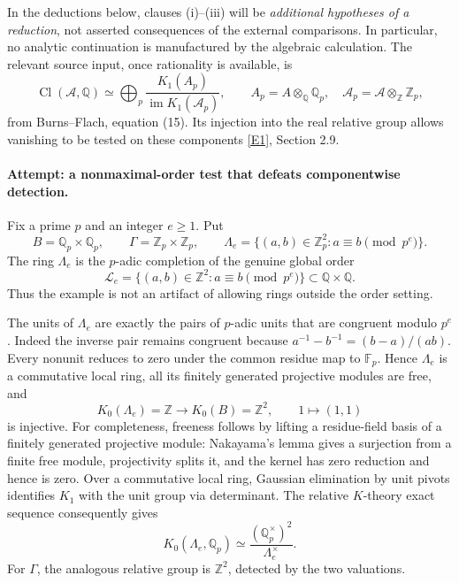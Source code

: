 \documentclass[11pt,a4paper]{article}
\newcommand{\Z}{\mathbb{Z}}
\newcommand{\Q}{\mathbb{Q}}
\newcommand{\F}{\mathbb{F}}
\newcommand{\eref}[2]{\hyperlink{extra:#1:#2}{[E#2]}}
\numberwithin{equation}{section}
\begin{document}
In the deductions below, clauses (i)--(iii) will be \emph{additional hypotheses of a reduction}, not asserted consequences of the external comparisons. In particular, no analytic continuation is manufactured by the algebraic calculation. The relevant source input, once rationality is available, is
\begin{equation}\label{r58:localization}
 \operatorname{Cl}(\mathcal A,\Q)
 \simeq\bigoplus_p
 \frac{K_1(A_p)}{\operatorname{im}K_1(\mathcal A_p)},
 \qquad A_p=A\otimes_{\Q}\Q_p,
 \quad\mathcal A_p=\mathcal A\otimes_{\Z}\Z_p,
\end{equation}
from Burns--Flach, equation (15). Its injection into the real relative group allows vanishing to be tested on these components \eref{30006700}{1}, Section 2.9.

\paragraph{Attempt: a nonmaximal-order test that defeats componentwise detection.}
Fix a prime $p$ and an integer $e\geq1$. Put
\[
 B=\Q_p\times\Q_p,\qquad
 \Gamma=\Z_p\times\Z_p,\qquad
 \Lambda_e=\{(a,b)\in\Z_p^2:a\equiv b\pmod{p^e}\}.
\]
The ring $\Lambda_e$ is the $p$-adic completion of the genuine global order
\[
 \mathcal L_e=\{(a,b)\in\Z^2:a\equiv b\pmod{p^e}\}
                           \subset\Q\times\Q.
\]
Thus the example is not an artifact of allowing rings outside the order setting.

The units of $\Lambda_e$ are exactly the pairs of $p$-adic units that are congruent modulo $p^e$. Indeed the inverse pair remains congruent because
$a^{-1}-b^{-1}=(b-a)/(ab)$. Every nonunit reduces to zero under the common residue map to $\F_p$. Hence $\Lambda_e$ is a commutative local ring, all its finitely generated projective modules are free, and
\[
 K_0(\Lambda_e)=\Z\longrightarrow K_0(B)=\Z^2,
 \qquad 1\longmapsto(1,1)
\]
is injective. For completeness, freeness follows by lifting a residue-field basis of a finitely generated projective module: Nakayama's lemma gives a surjection from a finite free module, projectivity splits it, and the kernel has zero reduction and hence is zero. Over a commutative local ring, Gaussian elimination by unit pivots identifies $K_1$ with the unit group via determinant. The relative $K$-theory exact sequence consequently gives
\begin{equation}\label{r58:toyrelative}
 K_0(\Lambda_e,\Q_p)\simeq
       \frac{(\Q_p^\times)^2}{\Lambda_e^\times}.
\end{equation}
For $\Gamma$, the analogous relative group is $\Z^2$, detected by the two valuations.
\end{document}
